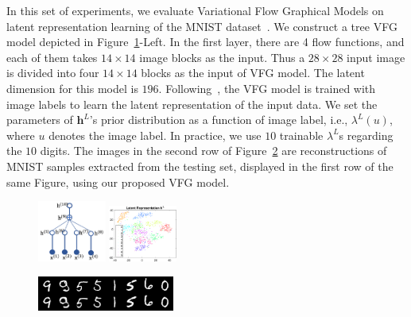\documentclass[sigconf, anonymous, review]{acmart}
\theoremstyle{plain}
\theoremstyle{definition}
\theoremstyle{remark}
\begin{document}
In this set of experiments, we evaluate  Variational Flow Graphical Models on latent representation learning of the MNIST dataset~\cite{Lecunmnist2010}. We construct a tree  VFG model depicted in Figure~\ref{fig:z_tsne}-Left.  
In the first layer, there are 4 flow functions, and each of them takes $14\times 14$ image blocks as the input. 
Thus a $28\times 28$ input image is divided into four $14\times 14$ blocks as the input of VFG model. 
The latent dimension for this model is $196$. 
Following~\cite{Sorrenson2020}, the VFG model is trained with image labels to learn the latent representation of the input data. 
We set the parameters of $\mathbf{h}^L$'s prior distribution as a function of image label, i.e., $\lambda^L(u)$, where $u$ denotes the image label. In practice, we use $10$ trainable $\lambda^L$s regarding the $10$ digits. 
The images in the second row of Figure~\ref{fig:reconst} are reconstructions of MNIST samples extracted from the testing set, displayed in the first row of the same Figure, using our proposed VFG model.  
\begin{figure}%
    \centering
       \includegraphics[width=0.2\textwidth]{fig/tree_mnist.png}
       \includegraphics[width=0.2\textwidth]{fig/z_Y.eps}
    \label{fig:z_tsne}
\vspace{-0.15in}
\end{figure}
\begin{figure}[H]
    \centering
       \includegraphics[width=0.4\textwidth]{fig/reconst_Y.png}
    \label{fig:reconst}
    \vspace{-0.15in}
\end{figure}
\end{document}
